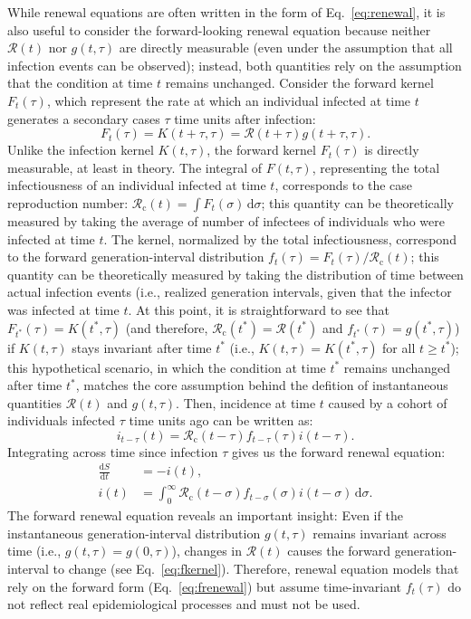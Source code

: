\documentclass[12pt]{article}
\newcommand{\eref}[1]{Eq.~\ref{eq:#1}}
\newcommand{\Rx}[1]{\ensuremath{{\mathcal R}_{#1}}\xspace}
\newcommand{\Rc}{\Rx{\mathrm{c}}}
\newcommand{\RR}{\ensuremath{{\mathcal R}}\xspace}
\newcommand{\dd}[1]{\ensuremath{\, \mathrm{d}#1}}
\newcommand{\dsigma}{\dd{\sigma}}
\begin{document}
While renewal equations are often written in the form of \eref{renewal}, it is also useful to consider the forward-looking renewal equation because neither $\RR(t)$ nor $g(t, \tau)$ are directly measurable (even under the assumption that all infection events can be observed); instead, both quantities rely on the assumption that the condition at time $t$ remains unchanged.
Consider the forward kernel $F_t(\tau)$, which represent the rate at which an individual infected at time $t$ generates a secondary cases $\tau$ time units after infection: 
\begin{equation}
F_t(\tau) = K(t+\tau, \tau) = \RR(t + \tau) g(t+\tau, \tau).
\label{eq:fkernel}
\end{equation}
Unlike the infection kernel $K(t, \tau)$, the forward kernel $F_t(\tau)$ is directly measurable, at least in theory.
The integral of $F(t, \tau)$, representing the total infectiousness of an individual infected at time $t$, corresponds to the case reproduction number: $\Rc(t) = \int F_t(\sigma) \dsigma$;
this quantity can be theoretically measured by taking the average of number of infectees of individuals who were infected at time $t$. 
The kernel, normalized by the total infectiousness, correspond to the forward generation-interval distribution $f_t(\tau) = F_t(\tau)/\Rc(t)$;
this quantity can be theoretically measured by taking the distribution of time between actual infection events (i.e., realized generation intervals, given that the infector was infected at time $t$.
At this point, it is straightforward to see that $F_{t^\ast}(\tau) = K(t^\ast, \tau)$ (and therefore, $\Rc(t^\ast) = \RR(t^\ast)$ and $f_{t^\ast}(\tau) = g(t^\ast,\tau)$) if $K(t, \tau)$ stays invariant after time $t^\ast$ (i.e., $K(t, \tau) = K(t^\ast, \tau)$ for all $t \geq t^\ast$); this hypothetical scenario, in which the condition at time $t^\ast$ remains unchanged after time $t^\ast$, matches the core assumption behind the defition of instantaneous quantities $\RR(t)$ and $g(t, \tau)$.
Then, incidence at time $t$ caused by a cohort of individuals infected $\tau$ time units ago can be written as:
\begin{equation}
i_{t-\tau}(t) = \Rc(t-\tau) f_{t-\tau}(\tau) i(t-\tau).
\end{equation}
Integrating across time since infection $\tau$ gives us the forward renewal equation:
\begin{align}
\frac{\mathrm{d}S}{\mathrm{d}t} &= - i(t),\\
i(t) &= \int_0^\infty \Rc(t-\sigma) f_{t-\sigma}(\sigma) i(t-\sigma) \dsigma.
\label{eq:frenewal}
\end{align}
The forward renewal equation reveals an important insight: Even if the instantaneous generation-interval distribution $g(t, \tau)$ remains invariant across time (i.e., $g(t, \tau) = g(0, \tau)$), changes in $\RR(t)$ causes the forward generation-interval to change (see \eref{fkernel}).
Therefore, renewal equation models that rely on the forward form (\eref{frenewal}) but assume time-invariant $f_t(\tau)$ do not reflect real epidemiological processes and must not be used.
\end{document}
